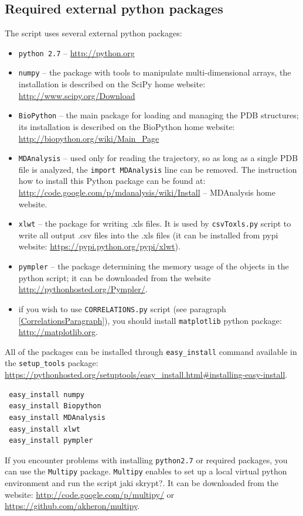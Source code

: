 \documentclass[12pt]{article}
\begin{document}
\subsection{Required external python packages} \label{external_pack}
The script uses several external python packages:
\begin{itemize}
\item {\tt python 2.7} -- \url{http://python.org}
\item  {\tt numpy} --  the package with tools to manipulate multi-dimensional arrays, the installation is described on the SciPy home website: \url{http://www.scipy.org/Download}
\item  {\tt BioPython} -- the main package for loading and managing the PDB structures; its installation is described on the BioPython home website: \url{http://biopython.org/wiki/Main_Page}
\item  {\tt MDAnalysis} \cite{Denning2012} -- used only for reading the trajectory, so as long as a single PDB file is analyzed, the \texttt{import MDAnalysis} line can be removed. The instruction how to install this Python package can be found at: \url{http://code.google.com/p/mdanalysis/wiki/Install} -- MDAnalysis home website. 
\item  {\tt xlwt} -- the package for writing .xls files. It is used by \texttt{csvToxls.py} script to write all output .csv files into the .xls files (it can be installed from pypi website: \url{https://pypi.python.org/pypi/xlwt}).
\item  {\tt pympler} -- the package determining the memory usage of the objects in the python script; it can be downloaded from the website \url{http://pythonhosted.org/Pympler/}. 
\item if you wish to use \texttt{CORRELATIONS.py} script (see paragraph \ref{CorrelationsParagraph}), you should install \texttt{matplotlib} python package: \url{http://matplotlib.org}. 
\end{itemize}

All of the packages can be installed through \texttt{easy\_install} command available in the \texttt{setup\_tools} package: \url{https://pythonhosted.org/setuptools/easy_install.html#installing-easy-install}. 

\begin{verbatim}
 easy_install numpy  
 easy_install Biopython
 easy_install MDAnalysis
 easy_install xlwt
 easy_install pympler
\end{verbatim}

If you encounter problems with installing {\tt python2.7} or required packages, you can use the \texttt{Multipy} package. \texttt{Multipy} enables to set up a local virtual python environment and run the script {\color{red} jaki skrypt?}. It can be downloaded from the website: \url{http://code.google.com/p/multipy/} or \url{https://github.com/akheron/multipy}. \\
\end{document}
